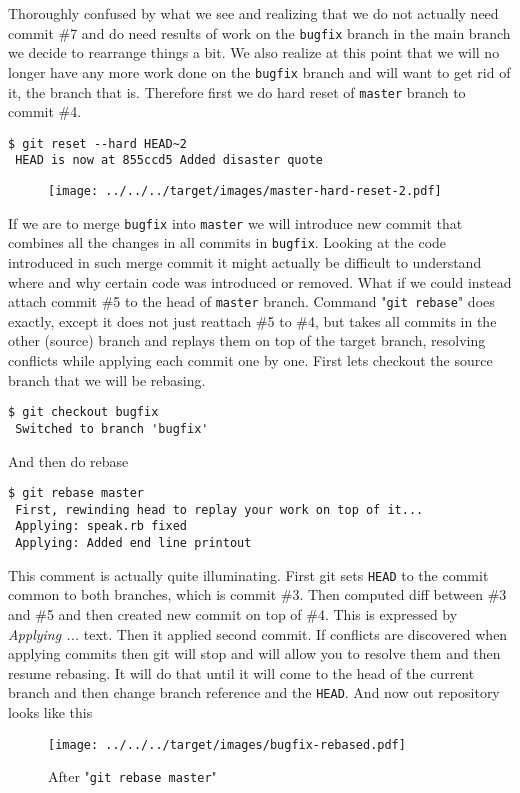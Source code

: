 \documentclass{article}
\theoremstyle{definition}
\begin{document}
        \noindent Thoroughly confused by what we see and realizing that we do not actually need commit \#7 and do need
        results of work on the \texttt{bugfix} branch in the main branch we decide to rearrange things a bit. We also
        realize at this point that we will no longer have any more work done on the \texttt{bugfix} branch and will
        want to get rid of it, the branch that is.  Therefore first we do hard reset of \texttt{master} branch to
        commit \#4.
        \begin{Verbatim}[frame=single]
 $ git reset --hard HEAD~2
 HEAD is now at 855ccd5 Added disaster quote
        \end{Verbatim}

        \begin{figure}[h]
        \centering\texttt{[image: ../../../target/images/master-hard-reset-2.pdf]}
        \caption{\label{fig:master-hard-reset-2}}
        \end{figure}

        \noindent If we are to merge \texttt{bugfix} into \texttt{master} we will introduce new commit that combines all
        the changes in all commits in \texttt{bugfix}. Looking at the code introduced in such merge commit it might
        actually be difficult to understand where and why certain code was introduced or removed. What if we could
        instead attach commit \#5 to the head of \texttt{master} branch. Command "\texttt{git rebase}" does exactly,
        except it does not just reattach \#5 to \#4, but takes all commits in the other (source) branch and replays them
        on top of the target branch, resolving conflicts while applying each commit one by one. First lets checkout
        the source branch that we will be rebasing.
        \begin{Verbatim}[frame=single]
 $ git checkout bugfix
 Switched to branch 'bugfix'
    \end{Verbatim}
    And then do rebase
        \begin{Verbatim}[frame=single]
 $ git rebase master
 First, rewinding head to replay your work on top of it...
 Applying: speak.rb fixed
 Applying: Added end line printout
        \end{Verbatim}
        This comment is actually quite illuminating. First git sets \texttt{HEAD} to the commit common to both
        branches, which is commit \#3. Then computed diff between \#3 and \#5 and then created new commit on top
        of \#4. This is expressed by {\em Applying ...} text. Then it applied second commit. If conflicts are discovered
        when applying commits then git will stop and will allow you to resolve them and then resume rebasing. It will do
        that until it will come to the head of the current branch and then change branch reference and
        the \texttt{HEAD}. And now out repository looks like this
        \newpage
        \begin{figure}[h]
        \centering\texttt{[image: ../../../target/images/bugfix-rebased.pdf]}
        \caption{After "\texttt{git rebase master}"\label{fig:bugfix-rebased}}
        \end{figure}
\end{document}
